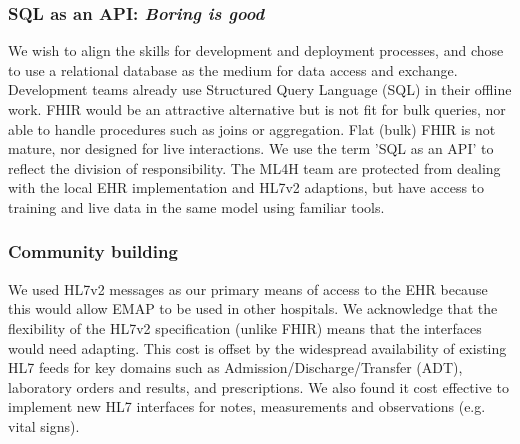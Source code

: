 \documentclass[pmlr,twocolumn,10pt]{jmlr} %
\begin{document}
\subsubsection{SQL as an API: \textit{Boring is good}}
We wish to align the skills for development and deployment processes, and chose to use a relational database as the medium for data access and exchange. Development teams already use Structured Query Language (SQL) in their offline work. FHIR would be an attractive alternative but is not fit for bulk queries, nor able to handle procedures such as joins or aggregation.\citep{2018c} Flat (bulk) FHIR is not mature, nor designed for live interactions.\citep{2021} We use the term 'SQL as an API' to reflect the division of responsibility. The ML4H team are protected from dealing with the local EHR implementation and HL7v2 adaptions, but have access to training and live data in the same model using familiar tools.

\subsubsection{Community building}
We used HL7v2 messages as our primary means of access to the EHR because this would allow EMAP to be used in other hospitals. We acknowledge that the flexibility of the HL7v2 specification (unlike FHIR) means that the interfaces would need adapting. This cost is offset by the widespread availability of existing HL7 feeds for key domains such as Admission/Discharge/Transfer (ADT), laboratory orders and results, and prescriptions. We also found it cost effective to implement new HL7 interfaces for notes, measurements and observations (e.g. vital signs).
\end{document}
